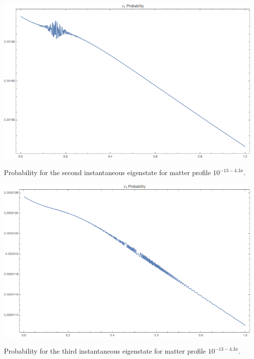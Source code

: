 \documentclass{tufte-handout}
\begin{document}
\begin{marginfigure}[2\baselineskip]
\includegraphics{assets/numericalMSW3Flavor-Inst-Eigen-prob-2.png}
\caption{Probability for the second instantaneous eigenstate for matter profile $10^{-13 - 4.3 x}$.}
\label{fig:numericalMSW3Flavor-Inst-Eigen-prob-2}
\end{marginfigure}

\begin{marginfigure}[2\baselineskip]
\includegraphics{assets/numericalMSW3Flavor-Inst-Eigen-prob-3.png}
\caption{Probability for the third instantaneous eigenstate for matter profile $10^{-13 - 4.3 x}$.}
\label{fig:numericalMSW3Flavor-Inst-Eigen-prob-3}
\end{marginfigure}
\end{document}
